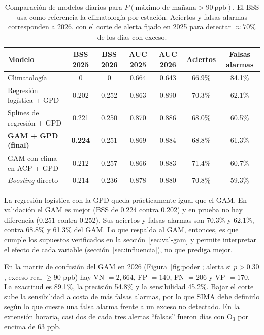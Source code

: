 \documentclass[11pt]{article}
\begin{document}
\begin{table}[!htbp]
\centering
\caption{Comparación de modelos diarios para $P(\text{máximo de mañana}>90\ \text{ppb})$. El BSS usa como referencia la climatología por estación. Aciertos y falsas alarmas corresponden a 2026, con el corte de alerta fijado en 2025 para detectar $\approx 70\%$ de los días con exceso.}
\label{tab:comparacion}
\small
\setlength{\tabcolsep}{4pt}
\begin{tabular}{@{}p{4.6cm}cccccc@{}}
\toprule
Modelo & BSS 2025 & BSS 2026 & AUC 2025 & AUC 2026 & Aciertos & Falsas alarmas \\
\midrule
Climatología                   & 0     & 0     & 0.664 & 0.643 & 66.9\% & 84.1\% \\
Regresión logística + GPD      & 0.202 & 0.252 & 0.863 & 0.890 & 70.3\% & 62.1\% \\
Splines de regresión + GPD     & 0.221 & 0.250 & 0.870 & 0.886 & 68.0\% & 60.5\% \\
\textbf{GAM + GPD (final)}     & \textbf{0.224} & 0.251 & 0.869 & 0.884 & 68.8\% & 61.3\% \\
GAM con clima en ACP + GPD     & 0.212 & 0.257 & 0.866 & 0.883 & 71.4\% & 60.7\% \\
\textit{Boosting} directo      & 0.214 & 0.236 & 0.878 & 0.880 & 70.8\% & 59.3\% \\
\bottomrule
\end{tabular}
\end{table}

La regresión logística con la GPD queda prácticamente igual que el GAM. En validación el GAM es mejor (BSS de 0.224 contra 0.202) y en prueba no hay diferencia (0.251 contra 0.252). Sus aciertos y falsas alarmas son 70.3\% y 62.1\%, contra 68.8\% y 61.3\% del GAM. Lo que respalda al GAM, entonces, es que cumple los supuestos verificados en la sección~\ref{sec:val-gam} y permite interpretar el efecto de cada variable (sección~\ref{sec:influencia}), no que prediga mejor.

En la matriz de confusión del GAM en 2026 (Figura~\ref{fig:poder}; alerta si $p>0.30$, exceso real $\geq 90$ ppb) hay VN $=2{,}664$, FP $=140$, FN $=206$ y VP $=170$. La exactitud es 89.1\%, la precisión 54.8\% y la sensibilidad 45.2\%. Bajar el corte sube la sensibilidad a costa de más falsas alarmas, por lo que SIMA debe definirlo según lo que cueste una falsa alarma frente a un exceso no detectado. En la extensión horaria, casi dos de cada tres alertas ``falsas'' fueron días con O$_3$ por encima de 63 ppb.
\end{document}

